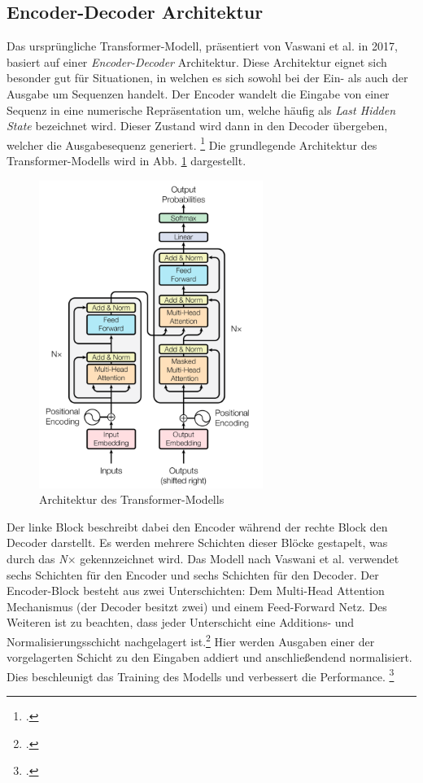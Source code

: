 \subsection{Encoder-Decoder Architektur}
Das ursprüngliche Transformer-Modell, präsentiert von Vaswani et al. in 2017, basiert auf einer \emph{Encoder-Decoder} Architektur. Diese Architektur eignet sich besonder gut für Situationen, in welchen es sich sowohl bei der Ein- als auch der Ausgabe um Sequenzen handelt. Der Encoder wandelt die Eingabe von einer Sequenz in eine numerische Repräsentation um, welche häufig als \emph{Last Hidden State} bezeichnet wird. Dieser Zustand wird dann in den Decoder übergeben, welcher die Ausgabesequenz generiert. \footcites[Vgl.][S. 3 ff.]{tunstall_natural_2022} Die grundlegende Architektur des Transformer-Modells wird in Abb. \ref{fig:transformer-architecture} dargestellt. 

\begin{figure}[h]
    \centering
    \includegraphics[height=100mm]{graphics/architecture.png}
    \caption[Architektur des Transformer-Modells]{Architektur des Transformer-Modells \footnotemark}
    \label{fig:transformer-architecture}
\end{figure}

Der linke Block beschreibt dabei den Encoder während der rechte Block den Decoder darstellt. Es werden mehrere Schichten dieser Blöcke gestapelt, was durch das \emph{N$\times$} gekennzeichnet wird. Das Modell nach Vaswani et al. verwendet sechs Schichten für den Encoder und sechs Schichten für den Decoder. Der Encoder-Block besteht aus zwei Unterschichten: Dem Multi-Head Attention Mechanismus (der Decoder besitzt zwei) und einem Feed-Forward Netz. Des Weiteren ist zu beachten, dass jeder Unterschicht eine Additions- und Normalisierungsschicht nachgelagert ist.\footcites[Vgl.][S. 3 ff.]{vaswani_attention_2017} Hier werden Ausgaben einer der vorgelagerten Schicht zu den Eingaben addiert und anschließendend normalisiert. Dies beschleunigt das Training des Modells und verbessert die Performance. \footcites[Vgl.][S. 10]{ba_layer_2016} 

